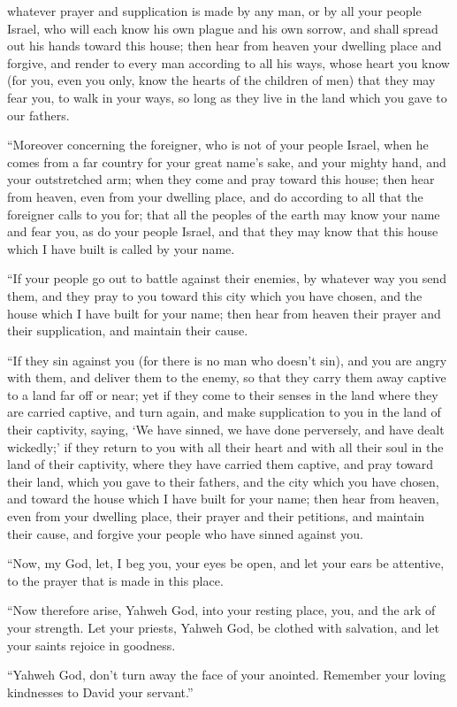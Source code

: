 {whatever prayer and supplication is made by any man, or by all your people Israel, who will each know his own plague and his own sorrow, and shall spread out his hands toward this house;
then hear from heaven your dwelling place and forgive, and render to every man according to all his ways, whose heart you know (for you, even you only, know the hearts of the children of men)
that they may fear you, to walk in your ways, so long as they live in the land which you gave to our fathers.
\par }{\PP {}“Moreover concerning the foreigner, who is not of your people Israel, when he comes from a far country for your great name’s sake, and your mighty hand, and your outstretched arm; when they come and pray toward this house;
then hear from heaven, even from your dwelling place, and do according to all that the foreigner calls to you for; that all the peoples of the earth may know your name and fear you, as do your people Israel, and that they may know that this house which I have built is called by your name.
\par }{\PP {}“If your people go out to battle against their enemies, by whatever way you send them, and they pray to you toward this city which you have chosen, and the house which I have built for your name;
then hear from heaven their prayer and their supplication, and maintain their cause.
\par }{\PP {}“If they sin against you (for there is no man who doesn’t sin), and you are angry with them, and deliver them to the enemy, so that they carry them away captive to a land far off or near;
yet if they come to their senses in the land where they are carried captive, and turn again, and make supplication to you in the land of their captivity, saying, ‘We have sinned, we have done perversely, and have dealt wickedly;’
if they return to you with all their heart and with all their soul in the land of their captivity, where they have carried them captive, and pray toward their land, which you gave to their fathers, and the city which you have chosen, and toward the house which I have built for your name;
then hear from heaven, even from your dwelling place, their prayer and their petitions, and maintain their cause, and forgive your people who have sinned against you.
\par }{\PP {}“Now, my God, let, I beg you, your eyes be open, and let your ears be attentive, to the prayer that is made in this place.
\par }{\PP {}“Now therefore arise, Yahweh God, into your resting place, you, and the ark of your strength. Let your priests, Yahweh God, be clothed with salvation, and let your saints rejoice in goodness.
\par }{\PP {}“Yahweh God, don’t turn away the face of your anointed. Remember your loving kindnesses to David your servant.”

}
